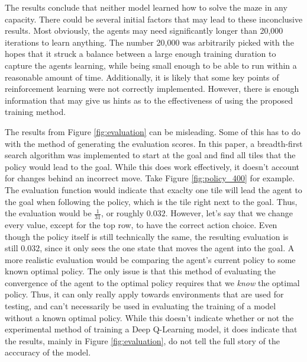 \documentclass[12pt]{article}
\begin{document}
The results conclude that neither model learned how to solve the maze in any capacity.
There could be several initial factors that may lead to these inconclusive results.
Most obviously, the agents may need significantly longer than 20,000 iterations to learn anything.
The number 20,000 was arbitrarily picked with the hopes that it struck a balance between a large enough training duration to capture the agents learning, while being small enough to be able to run within a reasonable amount of time.
Additionally, it is likely that some key points of reinforcement learning were not correctly implemented.
However, there is enough information that may give us hints as to the effectiveness of using the proposed training method.

The results from Figure \ref{fig:evaluation} can be misleading.
Some of this has to do with the method of generating the evaluation scores.
In this paper, a breadth-first search algorithm was implemented to start at the goal and find all tiles that the policy would lead to the goal.
While this does work effectively, it doesn't account for changes behind an incorrect move.
Take Figure \ref{fig:policy_400} for example.
The evaluation function would indicate that exaclty one tile will lead the agent to the goal when following the policy, which is the tile right next to the goal.
Thus, the evaluation would be $\frac{1}{31}$, or roughly $0.032$.
However, let's say that we change every value, except for the top row, to have the correct action choice.
Even though the policy itself is still technically the same, the resulting evaluation is still $0.032$, since it only sees the one state that moves the agent into the goal.
A more realistic evaluation would be comparing the agent's current policy to some known optimal policy.
The only issue is that this method of evaluating the convergence of the agent to the optimal policy requires that we \textit{know} the optimal policy.
Thus, it can only really apply towards environments that are used for testing, and can't necessarily be used in evaluating the training of a model without a known optimal policy.
While this doesn't indicate whether or not the experimental method of training a Deep Q-Learning model, it does indicate that the results, mainly in Figure \ref{fig:evaluation}, do not tell the full story of the acccuracy of the model.
\end{document}
